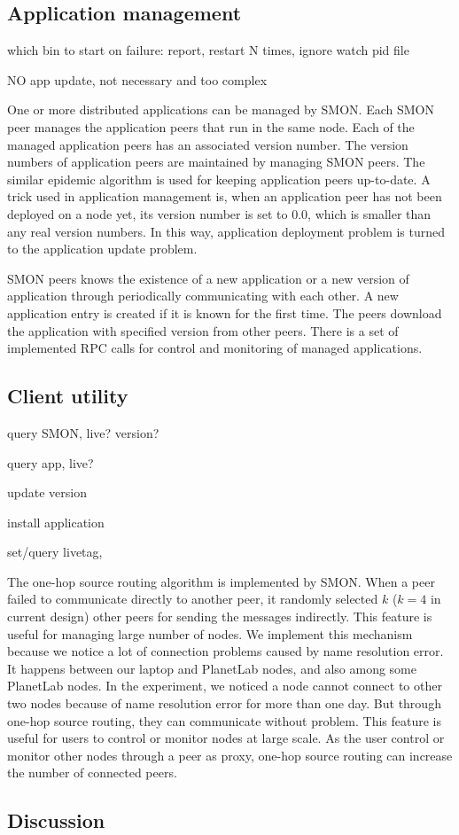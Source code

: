 \subsection{Application management}

which bin to start
on failure: report, restart N times, ignore
watch pid file

NO app update, not necessary and too complex

One or more distributed applications can be managed by SMON. Each
SMON peer manages the application peers that run in the same
node. Each of the managed application peers has an associated
version number.  The version numbers of application peers are
maintained by managing SMON peers. The similar epidemic algorithm
is used for keeping application peers up-to-date. A trick used
in application management is, when an application peer has not
been deployed on a node yet, its version number is set to 0.0,
which is smaller than any real version numbers. In this way,
application deployment problem is turned to the application
update problem.

SMON peers knows the existence of a new application or a new
version of application through periodically communicating with each
other. A new application entry is created if it is known for the
first time.  The peers download the application with specified
version from other peers. There is a set of implemented RPC
calls for control and monitoring of managed applications.


\subsection{Client utility}

query SMON, live? version?

query app, live?

update version

install application

set/query livetag, 




The one-hop source routing\cite{Gummadi2004} algorithm is
implemented by SMON. When a peer failed to communicate directly
to another peer, it randomly selected $k$ ($k=4$ in current
design) other peers for sending the messages indirectly.  This
feature is useful for managing large number of nodes. We
implement this mechanism because we notice a lot of connection
problems caused by name resolution error. It happens between our
laptop and PlanetLab nodes, and also among some PlanetLab nodes.
In the experiment, we noticed a node cannot connect to other two
nodes because of name resolution error for more than one day.
But through one-hop source routing, they can communicate without
problem. This feature is useful for users to control or monitor
nodes at large scale. As the user control or monitor other nodes
through a peer as proxy, one-hop source routing can increase the
number of connected peers.

\subsection{Discussion}




